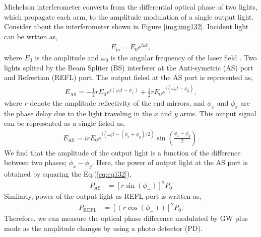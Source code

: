 Michelson interferometer converts from the differential optical phase of two lights, which propagate each arm, to the amplitude modulation of a single output light. Consider about the interferometer shown in Figure  \ref{img:img132}. Incident light can be wrtten as,
\begin{eqnarray}
  E_{\mathrm{in}} = E_{0} e^{i\omega{t}},
\end{eqnarray}
where $E_0$ is the amplitude and $\omega_0$ is the angular frequency of the laser field
. Two lights splited by the Beam Spliter (BS) interferer at the Anti-symetric (AS) port and Refrection (REFL) port. The output fieled at the AS port is represented as,
\begin{eqnarray}
  E_{\mathrm{AS}} = -\frac{1}{2}rE_{0} e^{i\left(\omega_{0} t-\phi_{x}\right)}+\frac{1}{2}r E_{0} e^{i\left(\omega_{0} t-\phi_{y}\right)},
\end{eqnarray}
where $r$ denote the amplitude reflectivity of the end mirrors, and $\phi_{x}$ and $\phi_{x}$ are the phase delay due to the light traveling in the $x$ and $y$ arms. This output signal can be represented as a single fieled as,
\begin{eqnarray}
E_{\mathrm{AS}} = i r E_{0} e^{i\left(\omega_{0} t-\left(\phi_{x}+\phi_{y}\right) / 2\right)} \sin \left(\frac{\phi_{x}-\phi_{y}}{2}\right). \label{eq:eq132}
\end{eqnarray} 
We find that the amplitude of the output light is a function of the difference between two phases; $\phi_{x}-\phi_{y}$. Here, the power of output light at the AS port is obtained by squaring the Eq.(\ref{eq:eq132}), 
\begin{eqnarray}
  P_{\mathrm{AS}} &=\left[r\sin({\phi_{-}})\right]^2P_0  \label{eq:eq133}
\end{eqnarray}
Similarly, power of the output light as REFL port is written as,
\begin{eqnarray}
  P_{\mathrm{REFL}} &=\left[(r\cos({\phi_{-}}))\right]^2P_0. \label{eq:eq134}
\end{eqnarray}
Therefore, we can measure the optical phase difference modulated by GW plus mode as the amplitude changes by using a photo detector (PD).

